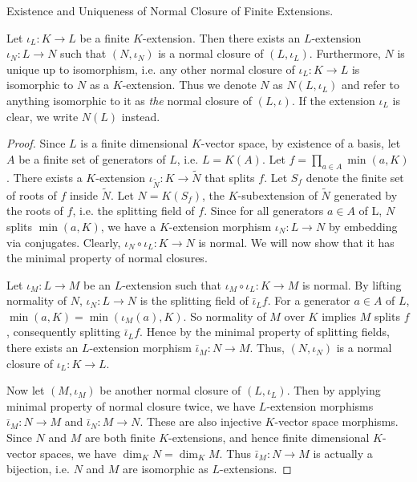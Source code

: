 \documentclass[../book.tex]{subfiles}
\begin{document}
\begin{thm} Existence and Uniqueness of Normal Closure of Finite Extensions.
    
    Let $\iota_L : K \to L$ be a finite $K$-extension. 
    Then there exists an $L$-extension $\iota_N : L \to N$ such that
    $(N,\iota_N)$ is a normal closure of $(L,\iota_L)$.
    Furthermore, $N$ is unique up to isomorphism, i.e.
    any other normal closure of $\iota_L : K \to L$ is
    isomorphic to $N$ as a $K$-extension. 
    Thus we denote $N$ as $N(L,\iota_L)$ and refer to anything isomorphic to it 
    as \emph{the} normal closure of $(L,\iota)$.
    If the extension $\iota_L$ is clear, we write $N(L)$ instead. 
\end{thm}
\begin{proof}
    Since $L$ is a finite dimensional $K$-vector space,
    by existence of a basis,
    let $A$ be a finite set of generators of $L$, i.e. $L = K(A)$.
    Let $f = \prod_{a \in A} \min(a,K)$. 
    There exists a $K$-extension $\iota_{\tilde{N}} : K \to \tilde{N}$ 
    that splits $f$. 
    Let $S_f$ denote the finite set of roots of $f$ inside $\tilde{N}$.
    Let $N = K(S_f)$, the $K$-subextension of $\tilde{N}$ generated 
    by the roots of $f$, i.e. the splitting field of $f$. 
    Since for all generators $a \in A$ of L, $N$ splits $\min(a,K)$,
    we have a $K$-extension morphism $\iota_N : L \to N$ by embedding via conjugates.
    Clearly, $\iota_N\circ\iota_L : K \to N$ is normal. 
    We will now show that it has the minimal property of normal closures. 
    
    Let $\iota_M : L \to M$ be an $L$-extension such that 
    $\iota_M\circ\iota_L : K \to M$ is normal. 
    By lifting normality of $N$, 
    $\iota_N : L \to N$ is the splitting field of $\bar\iota_L f$. 
    For a generator $a\in A$ of $L$, $\min(a,K) = \min(\iota_M(a),K)$. 
    So normality of $M$ over $K$ implies $M$ splits $f$,
    consequently splitting $\bar\iota_L f$. 
    Hence by the minimal property of splitting fields,
    there exists an $L$-extension morphism $\bar\iota_M : N \to M$.
    Thus, $(N,\iota_N)$ is a normal closure of $\iota_L : K \to L$.
    
    Now let $(M,\iota_M)$ be another normal closure of $(L,\iota_L)$. 
    Then by applying minimal property of normal closure twice,
    we have $L$-extension morphisms $\bar\iota_M : N \to M$ 
    and $\bar\iota_N : M \to N$.
    These are also injective $K$-vector space morphisms.
    Since $N$ and $M$ are both finite $K$-extensions,
    and hence finite dimensional $K$-vector spaces, 
    we have $\dim_K N = \dim_K M$.
    Thus $\bar\iota_M : N \to M$ is actually a bijection,
    i.e. $N$ and $M$ are isomorphic as $L$-extensions. 
\end{proof}
\end{document}
